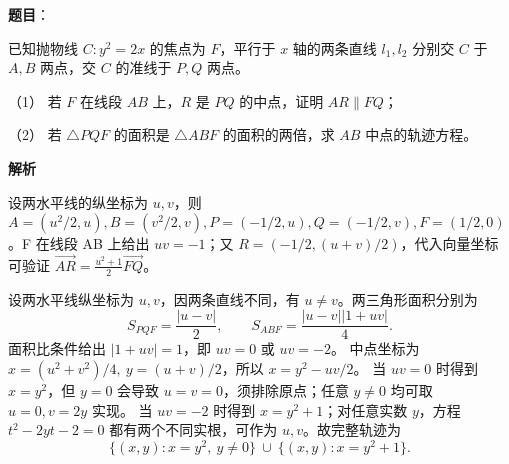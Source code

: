 \begin{answer}

\textbf{题目}：

已知抛物线 \(C:y^2=2x\) 的焦点为 \(F\)，平行于 \(x\) 轴的两条直线 \(l_1,l_2\) 分别交 \(C\) 于 \(A,B\) 两点，交 \(C\) 的准线于 \(P,Q\) 两点。

（1） 若 \(F\) 在线段 \(AB\) 上，\(R\) 是 \(PQ\) 的中点，证明 \(AR\parallel FQ\)；

（2） 若 \(\triangle PQF\) 的面积是 \(\triangle ABF\) 的面积的两倍，求 \(AB\) 中点的轨迹方程。

\textbf{解析}


设两水平线的纵坐标为 \(u,v\)，则 \(A=(u^2/2,u),B=(v^2/2,v),P=(-1/2,u),Q=(-1/2,v),F=(1/2,0)\)。F 在线段 AB 上给出 \(uv=-1\)；又 \(R=(-1/2,(u+v)/2)\)，代入向量坐标可验证 \(\overrightarrow{AR}=\frac{u^2+1}{2}\overrightarrow{FQ}\)。


设两水平线纵坐标为 \(u,v\)，因两条直线不同，有 \(u\ne v\)。两三角形面积分别为
\nopagebreak[4]
\[
S_{PQF}=\frac{|u-v|}{2},\qquad
S_{ABF}=\frac{|u-v||1+uv|}{4}.
\]
面积比条件给出 \(|1+uv|=1\)，即 \(uv=0\) 或 \(uv=-2\)。
中点坐标为 \(x=(u^2+v^2)/4,\ y=(u+v)/2\)，所以 \(x=y^2-uv/2\)。
当 \(uv=0\) 时得到 \(x=y^2\)，但 \(y=0\) 会导致 \(u=v=0\)，须排除原点；任意 \(y\ne0\) 均可取 \(u=0,v=2y\) 实现。
当 \(uv=-2\) 时得到 \(x=y^2+1\)；对任意实数 \(y\)，方程 \(t^2-2yt-2=0\) 都有两个不同实根，可作为 \(u,v\)。故完整轨迹为
\nopagebreak[4]
\[
\{(x,y):x=y^2,\ y\ne0\}\ \cup\ \{(x,y):x=y^2+1\}.
\]



\end{answer}
